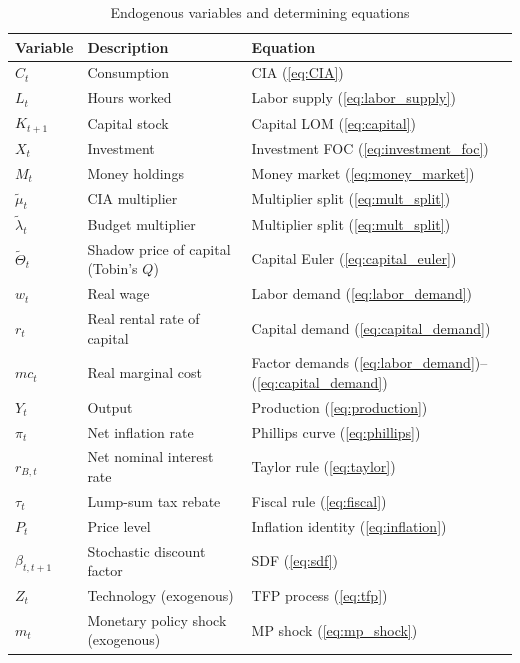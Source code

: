 \documentclass[11pt, a4paper]{article}
\begin{document}
\begin{table}[h!]
\centering
\caption{Endogenous variables and determining equations}
\label{tab:variables}
\begin{tabular}{lll}
\toprule
\textbf{Variable} & \textbf{Description} & \textbf{Equation} \\
\midrule
$C_t$               & Consumption                       & CIA (\ref{eq:CIA}) \\
$L_t$               & Hours worked                      & Labor supply (\ref{eq:labor_supply}) \\
$K_{t+1}$           & Capital stock                     & Capital LOM (\ref{eq:capital}) \\
$X_t$               & Investment                        & Investment FOC (\ref{eq:investment_foc}) \\
$M_t$               & Money holdings                    & Money market (\ref{eq:money_market}) \\
$\tilde{\mu}_t$     & CIA multiplier                    & Multiplier split (\ref{eq:mult_split}) \\
$\tilde{\lambda}_t$ & Budget multiplier                 & Multiplier split (\ref{eq:mult_split}) \\
$\tilde{\Theta}_t$  & Shadow price of capital (Tobin's $Q$) & Capital Euler (\ref{eq:capital_euler}) \\
$w_t$               & Real wage                         & Labor demand (\ref{eq:labor_demand}) \\
$r_t$               & Real rental rate of capital       & Capital demand (\ref{eq:capital_demand}) \\
$mc_t$              & Real marginal cost                & Factor demands (\ref{eq:labor_demand})--(\ref{eq:capital_demand}) \\
$Y_t$               & Output                            & Production (\ref{eq:production}) \\
$\pi_t$             & Net inflation rate                & Phillips curve (\ref{eq:phillips}) \\
$r_{B,t}$           & Net nominal interest rate         & Taylor rule (\ref{eq:taylor}) \\
$\tau_t$            & Lump-sum tax rebate               & Fiscal rule (\ref{eq:fiscal}) \\
$P_t$               & Price level                       & Inflation identity (\ref{eq:inflation}) \\
\midrule
$\beta_{t,t+1}$     & Stochastic discount factor        & SDF (\ref{eq:sdf}) \\
\midrule
$Z_t$               & Technology (exogenous)            & TFP process (\ref{eq:tfp}) \\
$m_t$               & Monetary policy shock (exogenous) & MP shock (\ref{eq:mp_shock}) \\
\bottomrule
\end{tabular}
\end{table}
\end{document}
